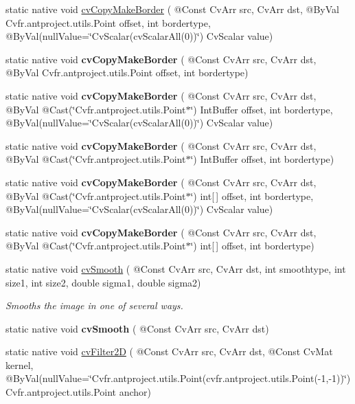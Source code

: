 \begin{DoxyCompactItemize}
\item 
static native void \hyperlink{group__imgproc__c_ga46ab19adc04378f8728b90f45240f5da}{cv\+Copy\+Make\+Border} ( @Const Cv\+Arr src, Cv\+Arr dst, @By\+Val Cv\+fr.antproject.utils.Point offset, int bordertype, @By\+Val(null\+Value=\char`\"{}Cv\+Scalar(cv\+Scalar\+All(0))\char`\"{}) Cv\+Scalar value)
\item 
static native void {\bfseries cv\+Copy\+Make\+Border} ( @Const Cv\+Arr src, Cv\+Arr dst, @By\+Val Cv\+fr.antproject.utils.Point offset, int bordertype)
\item 
static native void {\bfseries cv\+Copy\+Make\+Border} ( @Const Cv\+Arr src, Cv\+Arr dst, @By\+Val @Cast(\char`\"{}Cv\+fr.antproject.utils.Point$\ast$\char`\"{}) Int\+Buffer offset, int bordertype, @By\+Val(null\+Value=\char`\"{}Cv\+Scalar(cv\+Scalar\+All(0))\char`\"{}) Cv\+Scalar value)
\item 
static native void {\bfseries cv\+Copy\+Make\+Border} ( @Const Cv\+Arr src, Cv\+Arr dst, @By\+Val @Cast(\char`\"{}Cv\+fr.antproject.utils.Point$\ast$\char`\"{}) Int\+Buffer offset, int bordertype)
\item 
static native void {\bfseries cv\+Copy\+Make\+Border} ( @Const Cv\+Arr src, Cv\+Arr dst, @By\+Val @Cast(\char`\"{}Cv\+fr.antproject.utils.Point$\ast$\char`\"{}) int\mbox{[}$\,$\mbox{]} offset, int bordertype, @By\+Val(null\+Value=\char`\"{}Cv\+Scalar(cv\+Scalar\+All(0))\char`\"{}) Cv\+Scalar value)
\item 
static native void {\bfseries cv\+Copy\+Make\+Border} ( @Const Cv\+Arr src, Cv\+Arr dst, @By\+Val @Cast(\char`\"{}Cv\+fr.antproject.utils.Point$\ast$\char`\"{}) int\mbox{[}$\,$\mbox{]} offset, int bordertype)
\item 
static native void \hyperlink{group__imgproc__c_ga32746ef0800c2dfaad0e63fd8138362d}{cv\+Smooth} ( @Const Cv\+Arr src, Cv\+Arr dst, int smoothtype, int size1, int size2, double sigma1, double sigma2)
\begin{DoxyCompactList}\small\item\em Smooths the image in one of several ways. \end{DoxyCompactList}\item 
static native void {\bfseries cv\+Smooth} ( @Const Cv\+Arr src, Cv\+Arr dst)
\item 
static native void \hyperlink{group__imgproc__c_gaeb0ce4259621b5151099fcc7d4c25522}{cv\+Filter2D} ( @Const Cv\+Arr src, Cv\+Arr dst, @Const Cv\+Mat kernel, @By\+Val(null\+Value=\char`\"{}Cv\+fr.antproject.utils.Point(cv\+fr.antproject.utils.Point(-\/1,-\/1))\char`\"{}) Cv\+fr.antproject.utils.Point anchor)

\end{DoxyCompactItemize}
